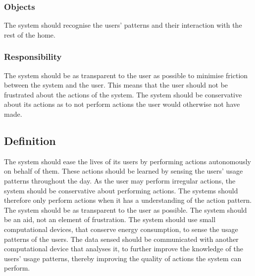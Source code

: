 \subsubsection{Objects}

The system should recognise the users' patterns and their interaction with the
rest of the home.

\subsubsection{Responsibility}

The system should be as transparent to the user as possible to minimise friction
between the system and the user. This means that the user should not be
frustrated about the actions of the system. The system should be conservative
about its actions as to not perform actions the user would otherwise not have made.

\subsection{Definition}

The system should ease the lives of its users by performing actions autonomously
on behalf of them. These actions should be learned by sensing the users' usage
patterns throughout the day. As the user may perform irregular actions, the
system should be conservative about performing actions. The systems should
therefore only perform actions when it has a understanding of the action
pattern. The system should be as transparent to the user as possible. The system
should be an aid, not an element of frustration. The system should use small
computational devices, that conserve energy consumption, to sense the usage
patterns of the users. The data sensed should be communicated with another
computational device that analyses it, to further improve the knowledge of the
users' usage patterns, thereby improving the quality of actions the system can perform.